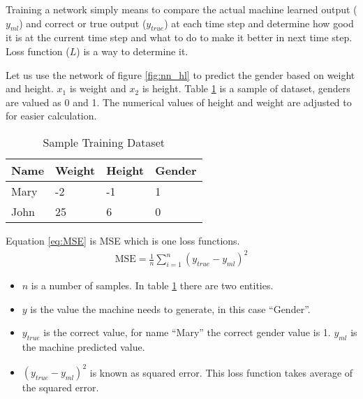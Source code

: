 Training a network simply means to compare the actual machine learned output ($ y_{ml} $) and correct or true output ($ y_ {true} $) at each time step and determine how good it is at the current time step and what to do to make it better in next time step. Loss function ($ L $) is a way to determine it. 

Let us use the network of figure \ref{fig:nn_hl} to predict the gender based on weight and height. $x_1$ is weight and $x_2$ is height. Table \ref{table:Sample Training Dataset} is a sample of dataset, genders are valued as 0 and 1. The numerical values of height and weight are adjusted to for easier calculation. 

\begin{table}[h]
    \centering
    \caption{Sample Training Dataset}
    \label{table:Sample Training Dataset}
    \begin{tabular}{ llll }
          \toprule
          
          \textbf{Name}& \textbf{Weight} & \textbf{Height}  & \textbf{Gender}\\
          \midrule
          Mary&-2 & -1 & 1\\
          John&25 & 6 & 0\\         
         
          \bottomrule
          \end{tabular}
\end{table}


Equation \ref{eq:MSE} is \acf{MSE} which is one loss functions. 
\begin{align}
    \text{MSE} = \frac{1}{n} \sum_{i=1}^{n} (y_ {true} - y_{ml})^2 \label{eq:MSE}
\end{align}


\begin{itemize}
    \item $n$ is a number of samples. In table \ref{table:Sample Training Dataset} there are two entities.
    \item $y$ is the value the machine needs to generate, in this case ``Gender''.
    \item $y_ {true}$ is the correct value, for name ``Mary'' the correct gender value is 1. $y_ {ml}$ is the machine  predicted value.
    \item $(y_ {true} - y_{ml})^2$ is known as squared error. This loss function takes average of the squared error.
\end{itemize}



